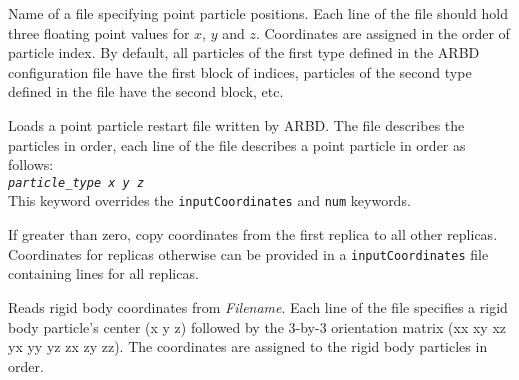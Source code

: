 \documentclass[10pt]{article}
\newcommand{\code}[1]{\texttt{#1}}
\begin{document}
{Name of a file specifying point particle positions. 
Each line of the file should hold three floating point values for $x$, $y$ and $z$.
Coordinates are assigned in the order of particle index.
By default, all particles of the first type defined in the ARBD configuration file have the first block of indices, particles of the second type defined in the file have the second block, etc.
}


{Loads a point particle restart file written by ARBD.
The file describes the particles in order, each line of the file describes a point particle in order as follows: \\ \noindent
\code{\textit{particle\_type} \textit{x} \textit{y} \textit{z}} \\ \noindent
This keyword overrides the \code{inputCoordinates} and \code{num} keywords.
}

{If greater than zero, copy coordinates from the first replica to all other replicas. 
Coordinates for replicas otherwise can be provided in a \code{inputCoordinates} 
 file containing lines for all replicas.
}

{Reads rigid body coordinates from \textit{Filename}.
Each line of the file specifies a rigid body particle's center (x y z) followed by the 3-by-3 orientation matrix (xx xy xz yx yy yz zx zy zz).
The coordinates are assigned to the rigid body particles in order.
}





\end{document}
